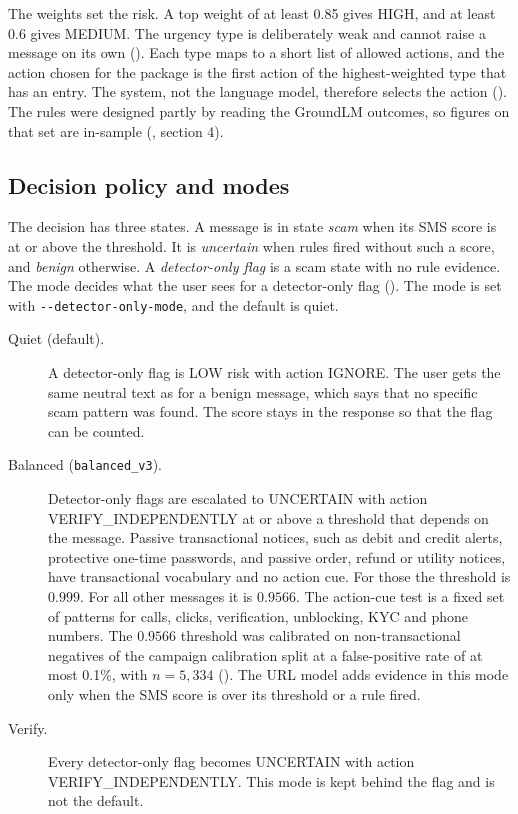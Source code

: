 The weights set the risk. A top weight of at least 0.85 gives HIGH, and at least 0.6 gives MEDIUM. The urgency type is deliberately weak and cannot raise a message on its own (). Each type maps to a short list of allowed actions, and the action chosen for the package is the first action of the highest-weighted type that has an entry. The system, not the language model, therefore selects the action (). The rules were designed partly by reading the GroundLM outcomes, so figures on that set are in-sample (, section 4).

\subsection{Decision policy and modes}
\label{sec:decision}

The decision has three states. A message is in state \emph{scam} when its SMS score is at or above the threshold. It is \emph{uncertain} when rules fired without such a score, and \emph{benign} otherwise. A \emph{detector-only flag} is a scam state with no rule evidence. The mode decides what the user sees for a detector-only flag (). The mode is set with \verb|--detector-only-mode|, and the default is quiet.

\begin{description}
  \item[Quiet (default).] A detector-only flag is LOW risk with action IGNORE. The user gets the same neutral text as for a benign message, which says that no specific scam pattern was found. The score stays in the response so that the flag can be counted.
  \item[Balanced (\texttt{balanced\_v3}).] Detector-only flags are escalated to UNCERTAIN with action VERIFY\_INDEPENDENTLY at or above a threshold that depends on the message. Passive transactional notices, such as debit and credit alerts, protective one-time passwords, and passive order, refund or utility notices, have transactional vocabulary and no action cue. For those the threshold is $0.999$. For all other messages it is $0.9566$. The action-cue test is a fixed set of patterns for calls, clicks, verification, unblocking, KYC and phone numbers. The $0.9566$ threshold was calibrated on non-transactional negatives of the campaign calibration split at a false-positive rate of at most 0.1\%, with $n = 5{,}334$ (). The URL model adds evidence in this mode only when the SMS score is over its threshold or a rule fired.
  \item[Verify.] Every detector-only flag becomes UNCERTAIN with action VERIFY\_INDEPENDENTLY. This mode is kept behind the flag and is not the default.
\end{description}

